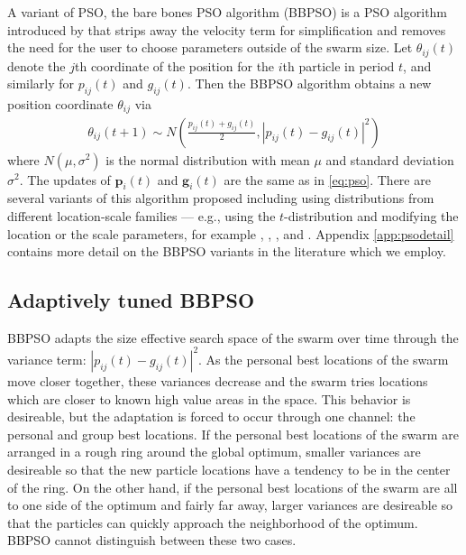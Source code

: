 \documentclass[12pt]{article}
\begin{document}
A variant of PSO, the bare bones PSO algorithm (BBPSO) is a PSO algorithm introduced by \citet{kennedy2003bare} that strips away the velocity term for simplification and removes the need for the user to choose parameters outside of the swarm size. Let $\theta_{ij}(t)$ denote the $j$th coordinate of the position for the $i$th particle in period $t$, and similarly for $p_{ij}(t)$ and $g_{ij}(t)$. Then the BBPSO algorithm obtains a new position coordinate $\theta_{ij}$ via
\begin{align}\label{eq:bbpso}
\theta_{ij}(t+1) \sim N\left(\frac{p_{ij}(t) + g_{ij}(t)}{2}, |p_{ij}(t) - g_{ij}(t)|^2\right)
\end{align}
where $N(\mu,\sigma^2)$ is the normal distribution with mean $\mu$ and standard deviation $\sigma^2$. The updates of $\bm{p}_i(t)$ and $\bm{g}_i(t)$ are the same as in \eqref{eq:pso}. There are several variants of this algorithm proposed including using distributions from different location-scale families --- e.g., using the $t$-distribution and modifying the location or the scale parameters, for example \citet{krohling2009bare}, \citet{hsieh2010modified}, \citet{richer2006levy}, and \citet{campos2014bare}. Appendix \ref{app:psodetail} contains more detail on the BBPSO variants in the literature which we employ.

\subsection{Adaptively tuned BBPSO}\label{subsec:ATBBPSO}
BBPSO adapts the size effective search space of the swarm over time through the variance term: $|p_{ij}(t) - g_{ij}(t)|^2$. As the personal best locations of the swarm move closer together, these variances decrease and the swarm tries locations which are closer to known high value areas in the space. This behavior is desireable, but the adaptation is forced to occur through one channel: the personal and group best locations. If the personal best locations of the swarm are arranged in a rough ring around the global optimum, smaller variances are desireable so that the new particle locations have a tendency to be in the center of the ring. On the other hand, if the personal best locations of the swarm are all to one side of the optimum and fairly far away, larger variances are desireable so that the particles can quickly approach the neighborhood of the optimum. BBPSO cannot distinguish between these two cases. 
\end{document}
